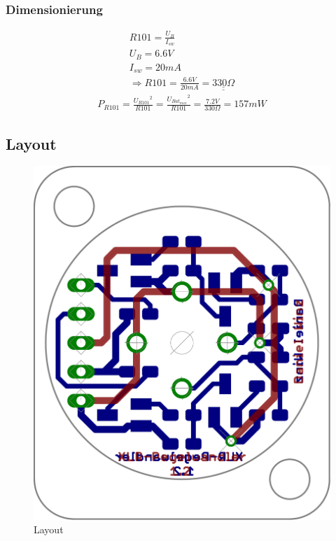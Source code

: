 \subsubsection{Dimensionierung}
\[ \begin{array}{l}
R101 = \frac{U_B}{I_{sw}}\\
U_B = 6.6 V\\
I_{sw} = 20 mA\\
\Rightarrow R101 = \frac{6.6V}{20mA} = \underline{\underline{330 \Omega}}
\end{array} \]
%
\[ \begin{array}{l}
P_{R101} = \frac{{U_{R101}}^2}{R101} = \frac{{U_{Bat_{max}}}^2}{R101} = \frac{7.2 V}{330 \Omega} = 157 mW
\end{array} \]

\subsection{Layout}
\begin{figure}[h!]
	\centering
	\includegraphics[scale=\layscale]{fig/xlr_pegelwandler_v_1_2_lay_transp.pdf}
	\caption{Layout}
	\label{lay:pegw}
\end{figure}
